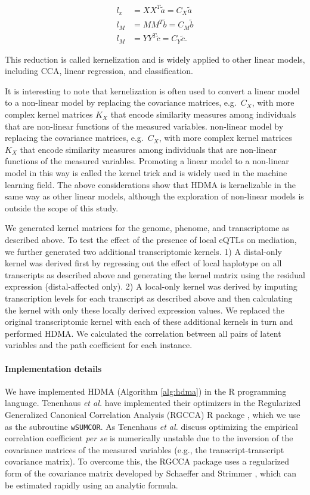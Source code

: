 \documentclass[
]{article}
\begin{document}
\begin{align}
l_x &= XX^T \tilde{a} = C_X \tilde{a} \\
l_M &= MM^T \tilde{b} = C_M \tilde{b} \\
l_M &= YY^T \tilde{c} = C_Y \tilde{c}.
\end{align}

This reduction is called kernelization \cite{tenenhaus2015kernel} and is
widely applied to other linear models, including CCA, linear regression,
and classification.

It is interesting to note that kernelization is often used to convert a
linear model to a non-linear model by replacing the covariance matrices,
e.g.~\(C_X\), with more complex kernel matrices \(K_X\) that encode
similarity measures among individuals that are non-linear functions of
the measured variables. non-linear model by replacing the covariance
matrices, e.g.~\(C_X\), with more complex kernel matrices \(K_X\) that
encode similarity measures among individuals that are non-linear
functions of the measured variables. Promoting a linear model to a
non-linear model in this way is called the kernel trick and is widely
used in the machine learning field. The above considerations show that
HDMA is kernelizable in the same way as other linear models, although
the exploration of non-linear models is outside the scope of this study.

We generated kernel matrices for the genome, phenome, and transcriptome
as described above. To test the effect of the presence of local eQTLs on
mediation, we further generated two additional transcriptomic kernels.
1) A distal-only kernel was derived first by regressing out the effect
of local haplotype on all transcripts as described above and generating
the kernel matrix using the residual expression (distal-affected only).
2) A local-only kernel was derived by imputing transcription levels for
each transcript as described above and then calculating the kernel with
only these locally derived expression values. We replaced the original
transcriptomic kernel with each of these additional kernels in turn and
performed HDMA. We calculated the correlation between all pairs of
latent variables and the path coefficient for each instance.

\paragraph{Implementation details}\label{implementation-details}

We have implemented HDMA (Algorithm \ref{alg:hdma}) in the R programming
language. Tenenhaus \textit{et al.} have implemented their optimizers in
the Regularized Generalized Canonical Correlation Analysis (RGCCA) R
package \cite{girka2023multiblock}, which we use as the subroutine
\texttt{wSUMCOR}. As Tenenhaus \textit{et al.} discuss optimizing the
empirical correlation coefficient \textit{per se} is numerically
unstable due to the inversion of the covariance matrices of the measured
variables (e.g., the transcript-transcript covariance matrix). To
overcome this, the RGCCA package uses a regularized form of the
covariance matrix developed by Schaeffer and Strimmer
\cite{schafer2005shrinkage}, which can be estimated rapidly using an
analytic formula.
\end{document}
